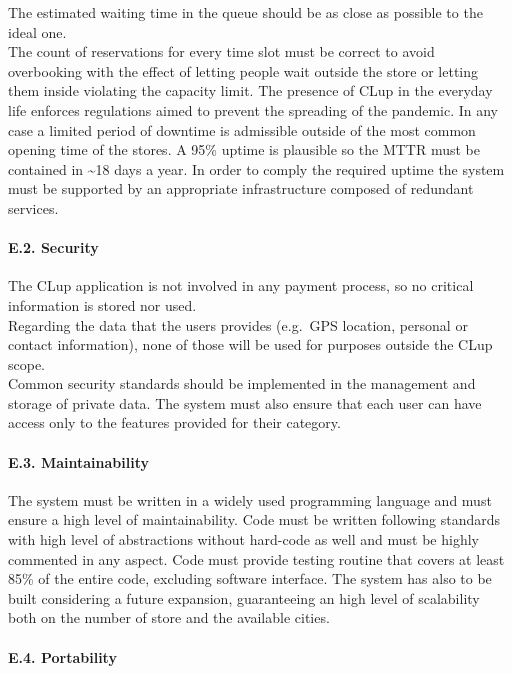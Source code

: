 \documentclass[
]{article}
\begin{document}
The estimated waiting time in the queue should be as close as possible
to the ideal one.\\
The count of reservations for every time slot must be correct to avoid
overbooking with the effect of letting people wait outside the store or
letting them inside violating the capacity limit. The presence of CLup
in the everyday life enforces regulations aimed to prevent the spreading
of the pandemic. In any case a limited period of downtime is admissible
outside of the most common opening time of the stores. A 95\% uptime is
plausible so the MTTR must be contained in \textasciitilde18 days a
year. In order to comply the required uptime the system must be
supported by an appropriate infrastructure composed of redundant
services.

\hypertarget{e.2.-security}{%
\paragraph{E.2. Security}\label{e.2.-security}}

The CLup application is not involved in any payment process, so no
critical information is stored nor used.\\
Regarding the data that the users provides (e.g.~GPS location, personal
or contact information), none of those will be used for purposes outside
the CLup scope.\\
Common security standards should be implemented in the management and
storage of private data. The system must also ensure that each user can
have access only to the features provided for their category.

\hypertarget{e.3.-maintainability}{%
\paragraph{E.3. Maintainability}\label{e.3.-maintainability}}

The system must be written in a widely used programming language and
must ensure a high level of maintainability. Code must be written
following standards with high level of abstractions without hard-code as
well and must be highly commented in any aspect. Code must provide
testing routine that covers at least 85\% of the entire code, excluding
software interface. The system has also to be built considering a future
expansion, guaranteeing an high level of scalability both on the number
of store and the available cities.

\hypertarget{e.4.-portability}{%
\paragraph{E.4. Portability}\label{e.4.-portability}}
\end{document}
